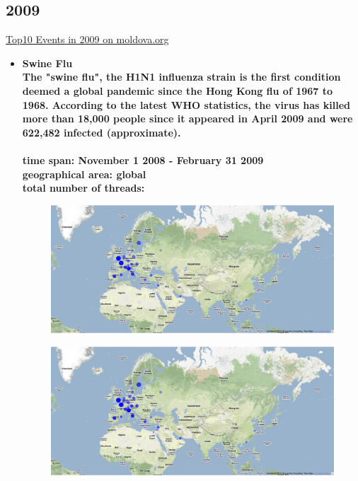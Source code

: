 \documentclass[11pt,a4paper,english]{article}
\begin{document}
			\subsection{2009}
			\href{http://social.moldova.org/news/10-most-important-world-events-of-2009-217390-eng.html}{Top10 Events in 2009 on moldova.org}
				\begin{itemize}
					\item \bf Swine Flu \rm
						\\ The "swine flu", the H1N1 influenza strain is the first condition deemed a global pandemic since the Hong Kong flu of 1967 to 1968. According to the latest WHO statistics, the virus has killed more than 18,000 people since it appeared in April 2009 and were 622,482 infected (approximate).
						\\\\ \bf time span: \rm November 1 2008 - February 31 2009
						\\ \bf geographical area: \rm global 
						\\ \bf total number of threads: \rm
						\begin{figure}[H]
							\vspace{-13pt}
  							\begin{center}
								\includegraphics[width=130mm]{img/pre-birdflu}
							\end{center}
							\vspace{-13pt}
						\end{figure}
						\begin{figure}[H]
							\vspace{-13pt}
	  						\begin{center}
								\includegraphics[width=130mm]{img/post-birdflu}

\end{center}
\end{figure}
\end{itemize}
\end{document}
